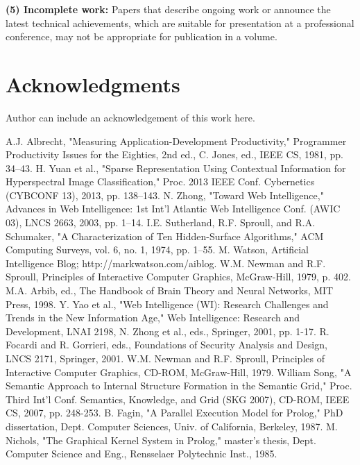 \documentclass[11pt, onecolumn, twoside, a4paper]{article}
\begin{document}
\noindent
{\bf (5)  Incomplete work:} Papers that describe ongoing work or announce the latest technical achievements, which are suitable for presentation at a professional conference, may not be appropriate for publication in a volume.





\section*{Acknowledgments}

Author can include an acknowledgement of this work here. 


\begin{thebibliography}{9}

 A.J. Albrecht, "Measuring Application-Development Productivity," Programmer Productivity Issues for the Eighties, 2nd ed., C. Jones, ed., IEEE CS, 1981, pp. 34–43.
 H. Yuan et al., "Sparse Representation Using Contextual Information for Hyperspectral Image Classification," Proc. 2013 IEEE Conf. Cybernetics (CYBCONF 13), 2013, pp. 138–143.
 N. Zhong, "Toward Web Intelligence," Advances in Web Intelligence: 1st Int'l Atlantic Web Intelligence Conf. (AWIC 03), LNCS 2663, 2003, pp. 1–14.
 I.E. Sutherland, R.F. Sproull, and R.A. Schumaker, "A Characterization of Ten Hidden-Surface Algorithms," ACM Computing Surveys, vol. 6, no. 1, 1974, pp. 1–55.
 M. Watson, Artificial Intelligence Blog; http://markwatson.com/aiblog.
 W.M. Newman and R.F. Sproull, Principles of Interactive Computer Graphics, McGraw-Hill, 1979, p. 402.
 M.A. Arbib, ed., The Handbook of Brain Theory and Neural Networks, MIT Press, 1998.
 Y. Yao et al., "Web Intelligence (WI): Research Challenges and Trends in the New Information Age," Web Intelligence: Research and Development, LNAI 2198, N. Zhong et al., eds., Springer, 2001, pp. 1-17. 
 R. Focardi and R. Gorrieri, eds., Foundations of Security Analysis and Design, LNCS 2171, Springer, 2001.
 W.M. Newman and R.F. Sproull, Principles of Interactive Computer Graphics, CD-ROM, McGraw-Hill, 1979.
 William Song, "A Semantic Approach to Internal Structure Formation in the Semantic Grid," Proc. Third Int'l Conf. Semantics, Knowledge, and Grid (SKG 2007), CD-ROM, IEEE CS, 2007, pp. 248-253.
 B. Fagin, "A Parallel Execution Model for Prolog," PhD dissertation, Dept. Computer Sciences, Univ. of California, Berkeley, 1987.
 M. Nichols, "The Graphical Kernel System in Prolog," master's thesis, Dept. Computer Science and Eng., Rensselaer Polytechnic Inst., 1985.

\end{thebibliography}
\end{document}
